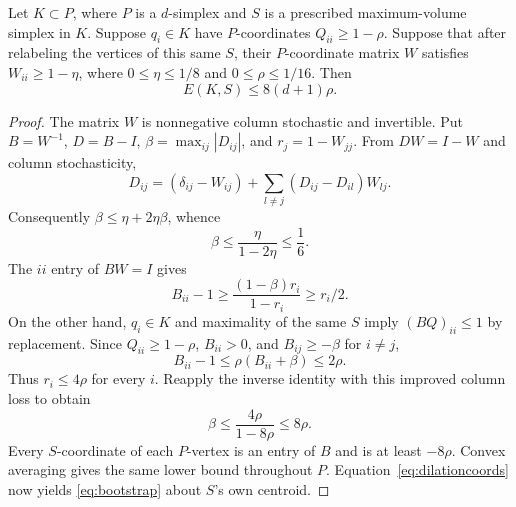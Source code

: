 \begin{lemma}\label{lem:bootstrap}
Let $K\subset P$, where $P$ is a $d$-simplex and $S$ is a prescribed
maximum-volume simplex in $K$. Suppose $q_i\in K$ have $P$-coordinates
$Q_{ii}\ge1-\rho$. Suppose that after relabeling the vertices of this same
$S$, their $P$-coordinate matrix $W$ satisfies $W_{ii}\ge1-\eta$, where
$0\le\eta\le1/8$ and $0\le\rho\le1/16$. Then
\begin{equation}\label{eq:bootstrap}
 E(K,S)\le8(d+1)\rho.
\end{equation}
\end{lemma}
\begin{proof}
The matrix $W$ is nonnegative column stochastic and invertible. Put
$B=W^{-1}$, $D=B-I$, $\beta=\max_{ij}|D_{ij}|$, and
$r_j=1-W_{jj}$. From $DW=I-W$ and column stochasticity,
\[
 D_{ij}=(\delta_{ij}-W_{ij})+
           \sum_{l\ne j}(D_{ij}-D_{il})W_{lj}.
\]
Consequently $\beta\le\eta+2\eta\beta$, whence
\begin{equation}\label{eq:firstinverse}
 \beta\le\frac\eta{1-2\eta}\le\frac16.
\end{equation}
The $ii$ entry of $BW=I$ gives
\[
 B_{ii}-1\ge\frac{(1-\beta)r_i}{1-r_i}\ge r_i/2.
\]
On the other hand, $q_i\in K$ and maximality of the same $S$ imply
$(BQ)_{ii}\le1$ by replacement. Since $Q_{ii}\ge1-\rho$,
$B_{ii}>0$, and $B_{ij}\ge-\beta$ for $i\ne j$,
\[
 B_{ii}-1\le\rho(B_{ii}+\beta)\le2\rho.
\]
Thus $r_i\le4\rho$ for every $i$. Reapply the inverse identity with this
improved column loss to obtain
\[
 \beta\le\frac{4\rho}{1-8\rho}\le8\rho.
\]
Every $S$-coordinate of each $P$-vertex is an entry of $B$ and is at least
$-8\rho$. Convex averaging gives the same lower bound throughout $P$.
Equation~\eqref{eq:dilationcoords} now yields \eqref{eq:bootstrap} about
$S$'s own centroid.
\end{proof}

